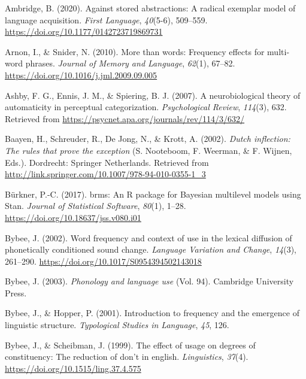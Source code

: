 \documentclass[
  man,floatsintext]{apa6}
\newlength{\cslhangindent}
\newenvironment{CSLReferences}[2] %
 {\begin{list}{}{%
  \setlength{\itemindent}{0pt}
  \setlength{\leftmargin}{0pt}
  \setlength{\parsep}{0pt}
  \ifodd #1
   \setlength{\leftmargin}{\cslhangindent}
   \setlength{\itemindent}{-1\cslhangindent}
  \fi
  \setlength{\itemsep}{#2\baselineskip}}}
 {\end{list}}
\begin{document}
\label{refs}
\begin{CSLReferences}{1}{0}
Ambridge, B. (2020). Against stored abstractions: A radical exemplar model of language acquisition. \emph{First Language}, \emph{40}(5-6), 509--559. \url{https://doi.org/10.1177/0142723719869731}

Arnon, I., \& Snider, N. (2010). More than words: Frequency effects for multi-word phrases. \emph{Journal of Memory and Language}, \emph{62}(1), 67--82. \url{https://doi.org/10.1016/j.jml.2009.09.005}

Ashby, F. G., Ennis, J. M., \& Spiering, B. J. (2007). A neurobiological theory of automaticity in perceptual categorization. \emph{Psychological Review}, \emph{114}(3), 632. Retrieved from \url{https://psycnet.apa.org/journals/rev/114/3/632/}

Baayen, H., Schreuder, R., De Jong, N., \& Krott, A. (2002). \emph{Dutch inflection: The rules that prove the exception} (S. Nooteboom, F. Weerman, \& F. Wijnen, Eds.). Dordrecht: Springer Netherlands. Retrieved from \url{http://link.springer.com/10.1007/978-94-010-0355-1_3}

Bürkner, P.-C. (2017). {brms}: An {R} package for {Bayesian} multilevel models using {Stan}. \emph{Journal of Statistical Software}, \emph{80}(1), 1--28. \url{https://doi.org/10.18637/jss.v080.i01}

Bybee, J. (2002). Word frequency and context of use in the lexical diffusion of phonetically conditioned sound change. \emph{Language Variation and Change}, \emph{14}(3), 261--290. \url{https://doi.org/10.1017/S0954394502143018}

Bybee, J. (2003). \emph{Phonology and language use} (Vol. 94). Cambridge University Press.

Bybee, J., \& Hopper, P. (2001). Introduction to frequency and the emergence of linguistic structure. \emph{Typological Studies in Language}, \emph{45}, 126.

Bybee, J., \& Scheibman, J. (1999). The effect of usage on degrees of constituency: The reduction of don't in english. \emph{Linguistics}, \emph{37}(4). \url{https://doi.org/10.1515/ling.37.4.575}


\end{CSLReferences}
\end{document}
